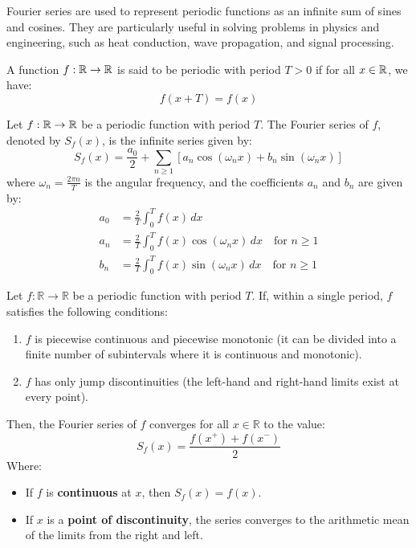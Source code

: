 Fourier series are used to represent periodic functions as an infinite sum of sines and cosines. They are particularly useful in solving problems in physics and engineering, such as heat conduction, wave propagation, and signal processing.
\begin{definicion}
    A function $f:\mathbb{R}\to \mathbb{R}$ is said to be periodic with period $T > 0$ if for all $x \in \mathbb{R}$, we have:
    \[
        f(x + T) = f(x)
    \]
\end{definicion}
\begin{definicion}
    Let $f:\mathbb{R}\to \mathbb{R}$ be a periodic function with period $T$. The Fourier series of $f$, denoted by $S_f(x)$, is the infinite series given by:
    \[
    S_f(x) =  \frac{a_0}{2} + \sum\limits_{n\geq 1}\left[a_n \cos\left(\omega_n x\right) + b_n \sin\left(\omega_n x\right)\right]
    \]
where $\omega_n = \frac{2\pi n}{T}$ is the angular frequency, and the coefficients $a_n$ and $b_n$ are given by:
\begin{align*}
    a_0 &= \frac{2}{T} \int_0^T f(x) \, dx \\
    a_n &= \frac{2}{T} \int_0^T f(x) \cos\left(\omega_n x\right) \, dx \quad \text{for } n \geq 1 \\
    b_n &= \frac{2}{T} \int_0^T f(x) \sin\left(\omega_n x\right) \, dx \quad \text{for } n \geq 1
\end{align*}
\end{definicion}
\begin{teo}
    Let $f: \mathbb{R} \to \mathbb{R}$ be a periodic function with period $T$. If, within a single period, $f$ satisfies the following conditions:
    \begin{enumerate}
        \item $f$ is piecewise continuous and piecewise monotonic (it can be divided into a finite number of subintervals where it is continuous and monotonic).
        \item $f$ has only jump discontinuities (the left-hand and right-hand limits exist at every point).
    \end{enumerate}
    Then, the Fourier series of $f$ converges for all $x \in \mathbb{R}$ to the value:
    \[
    S_f(x) = \frac{f(x^+) + f(x^-)}{2}
    \]
    Where:
    \begin{itemize}
        \item If $f$ is \textbf{continuous} at $x$, then $S_f(x) = f(x)$.
        \item If $x$ is a \textbf{point of discontinuity}, the series converges to the arithmetic mean of the limits from the right and left.
    \end{itemize}
\end{teo}
